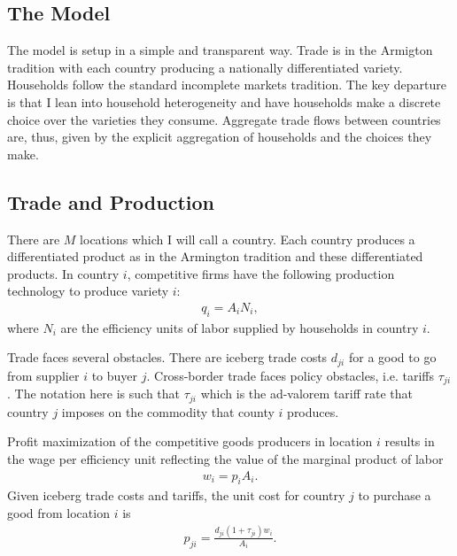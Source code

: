 \documentclass[12pt,pdftex]{article}
\begin{document}
\begin{onehalfspacing}
\hspace{-0.05cm}



\thispagestyle{empty}
\newpage
\normalsize

\section{The Model}

The model is setup in a simple and transparent way. Trade is in the Armigton tradition with each country producing a nationally differentiated variety. Households follow the standard incomplete markets tradition. The key departure is that I lean into household heterogeneity and have households make a discrete choice over the varieties they consume. Aggregate trade flows between countries are, thus, given by the explicit aggregation of households and the choices they make.

\subsection{Trade and Production}\label{sec:trade}

There are $M$ locations which I will call a country. Each country produces a differentiated product as in the Armington tradition and these differentiated products. In country $i$, competitive firms have the following production technology to produce variety $i$:
\begin{align}
q_i = A_i N_i,
\label{eq:production}
\end{align}
where $N_i$ are the efficiency units of labor supplied by households in country $i$.

Trade faces several obstacles. There are iceberg trade costs $d_{ji}$ for a good to go from supplier $i$ to buyer $j$. Cross-border trade faces policy obstacles, i.e. tariffs $\tau_{ji}$. The notation here is such that $\tau_{ji}$ which is the ad-valorem tariff rate that country $j$ imposes on the commodity that county $i$ produces.

Profit maximization of the competitive goods producers in location $i$ results in the wage per efficiency unit reflecting the value of the marginal product of labor
\begin{align}
w_{i} = p_{i} A_{i}.
\label{eq:marginal-product}
\end{align}
Given iceberg trade costs and tariffs, the unit cost for country $j$ to purchase a good from location $i$ is
\begin{align}
p_{ji} = \frac{d_{ji}(1 +\tau_{ji})w_{i}}{A_{i}}.
\label{eq:marginal-product-ship}
\end{align}


\end{onehalfspacing}
\end{document}
